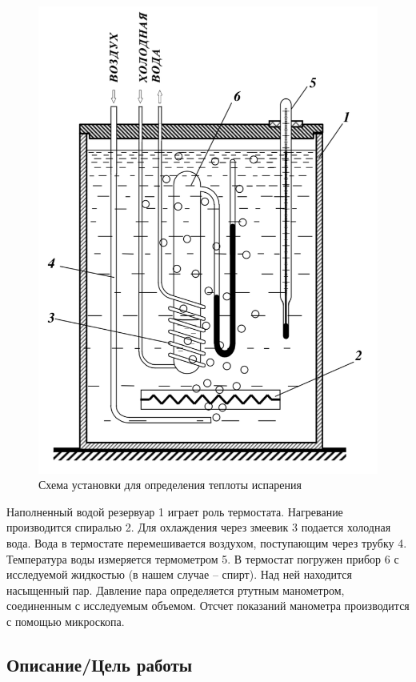 \documentclass[a4paper, 12pt]{article}
\theoremstyle{plain} %
\theoremstyle{definition} %
\theoremstyle{remark} %
\begin{document}
\begin{figure}\label{scheme}
	
	\includegraphics[scale=0.5]{scheme.png}
	\caption{Схема установки для определения теплоты испарения}
\end{figure}

Наполненный водой резервуар 1 играет роль термостата. Нагревание производится спиралью 2. Для охлаждения через змеевик 3 подается холодная вода. Вода в термостате перемешивается воздухом, поступающим через трубку 4. Температура воды измеряется термометром 5. В термостат погружен прибор 6 с исследуемой жидкостью (в нашем случае -- спирт). Над ней находится насыщенный пар. Давление пара определяется ртутным манометром, соединенным с исследуемым объемом. Отсчет показаний манометра производится с помощью микроскопа.\\[2ex]

\subsection{Описание/Цель работы}
\end{document}
